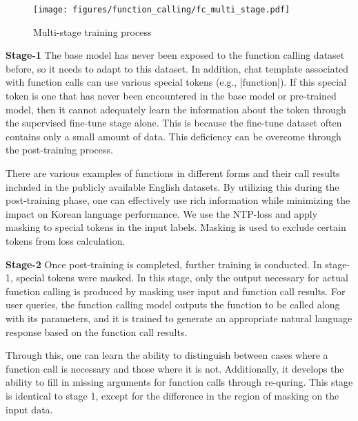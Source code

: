 \begin{figure}[h]
    \centering
    \texttt{[image: figures/function\_calling/fc\_multi\_stage.pdf]}
    \caption{Multi-stage training process}
    \label{fig:fc_multi_stage}
\end{figure}

\textbf{Stage-1} The base model has never been exposed to the function calling dataset before, so it needs to adapt to this dataset. In addition, chat template associated with function calls can use various special tokens (e.g., \big|function\big|). If this special token is one that has never been encountered in the base model or pre-trained model, then it cannot adequately learn the information about the token through the supervised fine-tune stage alone. This is because the fine-tune dataset often contains only a small amount of data. This deficiency can be overcome through the post-training process. \par

There are various examples of functions in different forms and their call results included in the publicly available English datasets.  By utilizing this during the post-training phase, one can effectively use rich information while minimizing the impact on Korean language performance. We use the NTP-loss and apply masking to special tokens in the input labels. Masking is used to exclude certain tokens from loss calculation.\par

\textbf{Stage-2} Once post-training is completed, further training is conducted. In stage-1, special tokens were masked. In this stage, only the output necessary for actual function calling is produced by masking user input and function call results. For user queries, the function calling model outputs the function to be called along with its parameters, and it is trained to generate an appropriate natural language response based on the function call results.\par
Through this, one can learn the ability to distinguish between cases where a function call is necessary and those where it is not. Additionally, it develops the ability to fill in missing arguments for function calls through re-quring. This stage is identical to stage 1, except for the difference in the region of masking on the input data.\par



